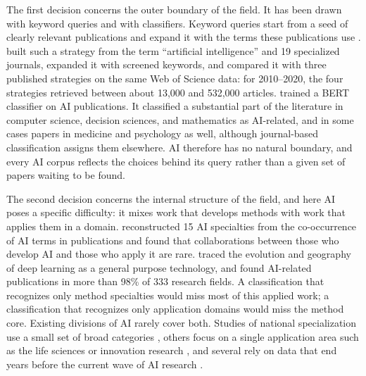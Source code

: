 \documentclass[10pt,twocolumn,a4paper]{article}
\begin{document}
	The first decision concerns the outer boundary of the field. It has been drawn with keyword queries and with classifiers. Keyword queries start from a seed of clearly relevant publications and expand it with the terms these publications use \parencite{baruffaldi2020identifying}. \textcite{liu2021tracking} built such a strategy from the term ``artificial intelligence'' and 19 specialized journals, expanded it with screened keywords, and compared it with three published strategies on the same Web of Science data: for 2010--2020, the four strategies retrieved between about 13,000 and 532,000 articles. \textcite{sachini2022ai} trained a BERT classifier on AI publications. It classified a substantial part of the literature in computer science, decision sciences, and mathematics as AI-related, and in some cases papers in medicine and psychology as well, although journal-based classification assigns them elsewhere. AI therefore has no natural boundary, and every AI corpus reflects the choices behind its query rather than a given set of papers waiting to be found.
	
	The second decision concerns the internal structure of the field, and here AI poses a specific difficulty: it mixes work that develops methods with work that applies them in a domain. \textcite{gargiulo2022cartography} reconstructed 15 AI specialties from the co-occurrence of AI terms in publications and found that collaborations between those who develop AI and those who apply it are rare. \textcite{klinger2021deep} traced the evolution and geography of deep learning as a general purpose technology, and \textcite{hajkowicz2023artificial} found AI-related publications in more than 98\% of 333 research fields. A classification that recognizes only method specialties would miss most of this applied work; a classification that recognizes only application domains would miss the method core. Existing divisions of AI rarely cover both. Studies of national specialization use a small set of broad categories \parencite{righi2020ai,yu2023discovering}, others focus on a single application area such as the life sciences \parencite{schmallenbach2024global} or innovation research \parencite{mariani2023artificial}, and several rely on data that end years before the current wave of AI research \parencite{niu2016global,righi2020ai}.
	
\end{document}
